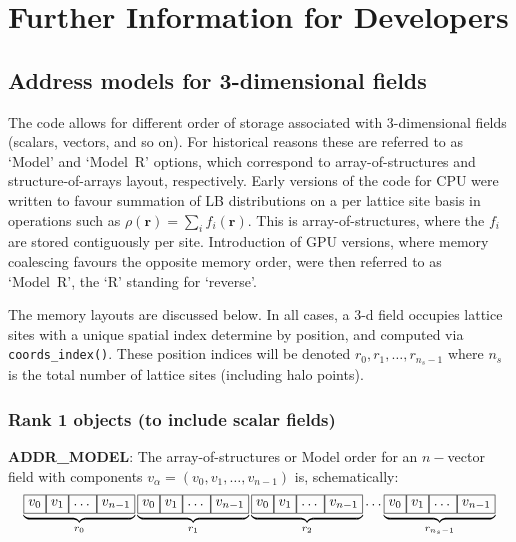 %
%
%
%
%

\section{Further Information for Developers}

\subsection{Address models for 3-dimensional fields}

The code allows for different order of storage associated with 3-dimensional
fields (scalars, vectors, and so on). For historical reasons these are
referred to as `Model' and `Model~R' options, which correspond
to array-of-structures and structure-of-arrays layout, respectively. Early
versions of the code for CPU were written to favour summation of LB
distributions on a per lattice site basis in operations such as
$\rho(\mathbf{r}) = \sum_i f_i(\mathbf{r})$. This is array-of-structures,
where the $f_i$ are stored contiguously per site. Introduction of GPU
versions, where memory coalescing favours the opposite memory order,
were then referred to as `Model~R', the `R' standing for `reverse'.

The memory layouts are discussed below. In all cases, a 3-d field occupies
lattice sites with a unique spatial index determine by position, and
computed via \texttt{coords\_index()}. These position indices will be denoted
$r_0, r_1, \ldots, r_{n_s-1}$ where $n_s$ is the total number of lattice
sites (including halo points).

\subsubsection{Rank 1 objects (to include scalar fields)}

\textbf{ADDR\_MODEL}: The array-of-structures or Model order for an
$n-$vector field
with components $ v_\alpha = (v_0, v_1, \ldots, v_{n-1})$ is, schematically:
\[
\underbrace{ \boxed{v_0\vphantom{v_{n-1}}} \boxed{v_1\vphantom{v_{n-1}}}
\boxed{\ldots\vphantom{v_{n-1}}} \boxed{v_{n-1}} }_{r_0}
\underbrace{ \boxed{v_0\vphantom{v_{n-1}}} \boxed{v_1\vphantom{v_{n-1}}}
\boxed{\ldots\vphantom{v_{n-1}}} \boxed{v_{n-1}} }_{r_1}
\underbrace{ \boxed{v_0\vphantom{v_{n-1}}} \boxed{v_1\vphantom{v_{n-1}}}
\boxed{\ldots\vphantom{v_{n-1}}} \boxed{v_{n-1}} }_{r_2} \ldots
\underbrace{ \boxed{v_0\vphantom{v_{n-1}}} \boxed{v_1\vphantom{v_{n-1}}}
\boxed{\ldots\vphantom{v_{n-1}}} \boxed{v_{n-1}} }_{r_{n_s-1}}
\]

